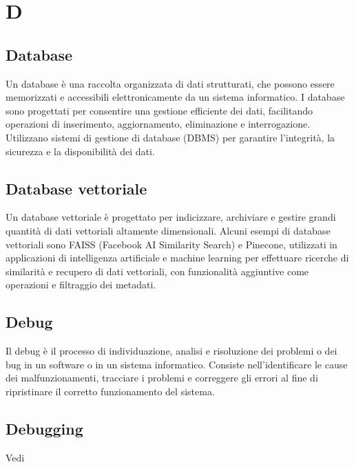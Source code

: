 \section{D}

\vspace{2em}
\subsection*{Database}
Un database è una raccolta organizzata di dati strutturati, che possono essere memorizzati e accessibili elettronicamente da un sistema informatico. I database sono progettati per consentire una gestione efficiente dei dati, facilitando operazioni di inserimento, aggiornamento, eliminazione e interrogazione. Utilizzano sistemi di gestione di database (DBMS) per garantire l'integrità, la sicurezza e la disponibilità dei dati.

\vspace{2em}
\subsection*{Database vettoriale}
Un database vettoriale è progettato per indicizzare, archiviare e gestire grandi quantità di dati vettoriali altamente dimensionali. Alcuni esempi di database vettoriali sono FAISS (Facebook AI Similarity Search) e Pinecone, utilizzati in applicazioni di intelligenza artificiale e machine learning per effettuare ricerche di similarità e recupero di dati vettoriali, con funzionalità aggiuntive come operazioni  e filtraggio dei metadati.

\vspace{2em}
\subsection*{Debug}
Il debug è il processo di individuazione, analisi e risoluzione dei problemi o dei bug in un software o in un sistema informatico. Consiste nell'identificare le cause dei malfunzionamenti, tracciare i problemi e correggere gli errori al fine di ripristinare il corretto funzionamento del sistema.

\vspace{2em}
\subsection*{Debugging}
\par Vedi 


